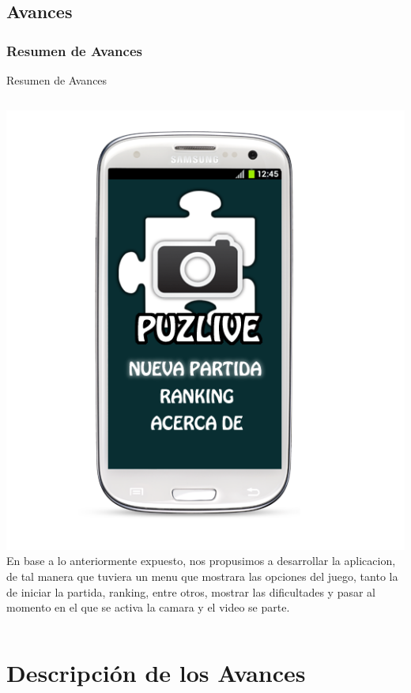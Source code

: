 \documentclass[serif,11pt]{beamer}
\begin{document}
		\subsection{Avances}
		
			\begin{frame}\frametitle{Resumen de Avances}
				\pause \bigskip
				\begin{block}{Resumen de Avances}
					\begin{columns}
						 \hspace{0.5cm}
						\includegraphics[width=1\textwidth]{androidpro4} 
						En base a lo anteriormente expuesto, nos propusimos a desarrollar la aplicacion, de
						tal manera que tuviera un menu que mostrara las opciones del juego, tanto la de
						iniciar la partida, ranking, entre otros, mostrar las dificultades y pasar al momento 
						en el que se activa la camara y el video se parte.	
					\end{columns}
				\end{block}
			\end{frame}

		

	\section{Descripci\'on de los Avances} 
\end{document}
